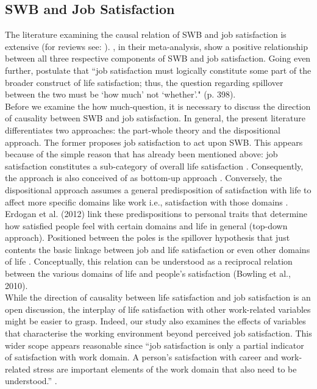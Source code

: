 \documentclass[preprint,12pt,authoryear]{elsarticle}
\begin{document}
\subsection{SWB and Job Satisfaction}
The literature examining the causal relation of SWB and job satisfaction is extensive
(for reviews see: \citet{bowling_meta-analytic_2010,erdogan_whistle_2012}). \citet{bowling_meta-analytic_2010}, in their
meta-analysis, show a positive relationship between all three respective components of SWB and job satisfaction.
Going even further, \citet{near_job_1987} postulate that “job satisfaction must logically constitute some part of the
broader construct of life satisfaction; thus, the question regarding spillover between the two must be ‘how much’ not
‘whether’." (p. 398). \\
Before we examine the how much-question, it is necessary to discuss the direction of causality between SWB and job
satisfaction. In general, the present literature differentiates two approaches: the part-whole theory
\citep{bowling_meta-analytic_2010,hart_predicting_1999,judge_dispositional_1998} and the dispositional approach. The former
proposes job satisfaction to act upon SWB. This appears because of the simple reason that has already been mentioned
above: job satisfaction constitutes a sub-category of overall life satisfaction \citep[cf.]{near_job_1987}.
Consequently, the approach is also conceived of as bottom-up approach \citep{erdogan_whistle_2012}. Conversely, the
dispositional approach assumes a general predisposition of satisfaction with life to affect more specific domains like work
i.e., satisfaction with those domains \citep{bowling_meta-analytic_2010,diener_subjective_1984,headey_top-down_1991,judge_job_1993,judge_another_1993}. 
Erdogan et al. (2012) link these predispositions to personal traits that determine how satisfied people feel with certain
domains and life in general (top-down approach). Positioned between the poles is the spillover hypothesis that just
contents the basic linkage between job and life satisfaction or even other domains of life 
\citep{bowling_meta-analytic_2010,erdogan_whistle_2012,judge_job_2001,judge_individual_1994}.
Conceptually, this relation can be understood as a reciprocal relation between the various domains of life and people’s
satisfaction (Bowling et al., 2010). \\
While the direction of causality between life satisfaction and job satisfaction is an open discussion, the interplay of life
satisfaction with other work-related variables might be easier to grasp. Indeed, our study also examines the effects of
variables that characterise the working environment beyond perceived job satisfaction. This wider scope appears
reasonable since “job satisfaction is only a partial indicator of satisfaction with work domain. A person’s satisfaction with
career and work-related stress are important elements of the work domain that also need to be understood.” \citep[p. 1042]{erdogan_whistle_2012}.
\end{document}
